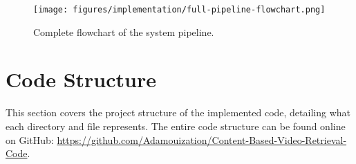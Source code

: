 \begin{figure}[h] 
\centerline{\texttt{[image: figures/implementation/full-pipeline-flowchart.png]}}
\caption{\label{fig:CBVR-flowchart}Complete flowchart of the system pipeline.}
\end{figure}


\section{Code Structure}

This section covers the project structure of the implemented code, detailing what each directory and file represents. The entire code structure can be found online on GitHub: \url{https://github.com/Adamouization/Content-Based-Video-Retrieval-Code}.

